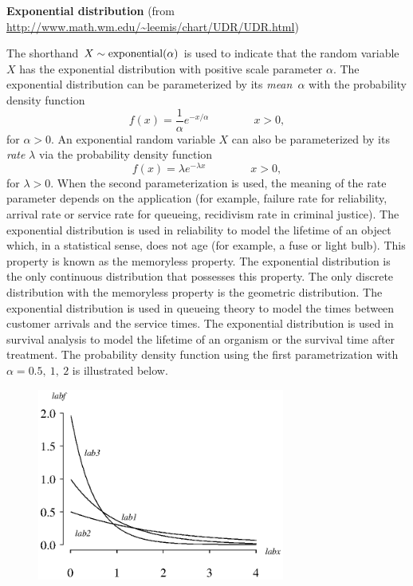 \documentclass[12pt,fullpage]{article}
\begin{document}
\noindent
{\bf Exponential distribution} (from \color{blue}\url{http://www.math.wm.edu/~leemis/chart/UDR/UDR.html}\color{black})

\noindent
The shorthand $X \sim {\rm exponential}(\alpha)$ is used to indicate
that the random variable $X$ has the exponential distribution with
positive scale parameter $\alpha$.  The exponential distribution can
be parameterized by its {\it mean\/}~{$\alpha$} with the probability density
function
$$
f(x) = \frac{1}{\alpha} e ^ {- x / \alpha} \qquad \qquad x > 0,
$$
for $\alpha > 0$.
An exponential random variable $X$ can also be parameterized by its
{\it rate\/} $\lambda$ via the probability density function 
$$
f(x) = \lambda e ^ {- \lambda x} \qquad \qquad x > 0,
$$
for $\lambda > 0$.
When the second parameterization is used, the meaning of the rate parameter depends
on the application (for example, failure rate for reliability, arrival rate or service rate
for queueing, recidivism rate in criminal justice).
The exponential distribution is used in reliability to model the lifetime of an
object which, in a statistical sense, does not age (for example, a
fuse or light bulb).  This property is known as the memoryless property.
The exponential distribution is the only continuous distribution that
possesses this property.
The only discrete distribution with the memoryless property is the
geometric distribution.
The exponential distribution is used in queueing
theory to model the times between customer arrivals and the service times.
The exponential distribution is used in survival analysis to model
the lifetime of an organism or the survival time after treatment.
The probability density function using the first parametrization with $\alpha = 0.5,\ 1,\ 2$ is illustrated below.

\begin{figure}[h!]
\begin{center}
\includegraphics[width=3.2in]{ExponentialPlot.ps}
\end{center}
\end{figure}
\end{document}
